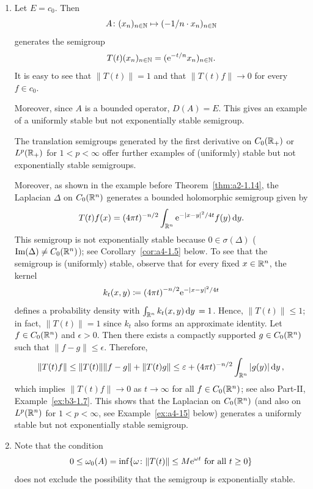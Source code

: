 \begin{example}\label{ex:a4-1.2}
\begin{enumerate}[\upshape (i), wide, labelindent=.25em]

\item 
Let $E = c_{0}$. 
Then 
\[
A \colon (x_{n})_{n \in \mathbb{N}} \mapsto (-1/n \cdot x_{n})_{n \in \mathbb{N}}
\] 
generates the semigroup 
\[
T(t)(x_{n})_{n \in \mathbb{N}} = (\mathrm{e}^{-t/n} x_{n})_{n \in \mathbb{N}}.
\]
It is easy to see that $\|T(t)\|=1$ and that $\|T(t)f\|\to 0$ for every $f \in c_{0}$.

Moreover, since $A$ is a bounded operator, $D(A) = E$.
This gives an example of a uniformly stable but not exponentially stable semigroup.

The translation semigroups generated by the first derivative on $C_0(\mathbb{R}_{+})$ or $L^{p}(\mathbb{R}_{+})$ for $1 < p < \infty$ offer further examples of (uniformly) stable but not exponentially stable semigroups.

Moreover, as shown in the example before Theorem~\ref{thm:a2-1.14},
the Laplacian $\Delta$ on $C_0(\mathbb{R}^{n})$ generates a bounded holomorphic semigroup given by 
\[
T(t)f(x) = (4\pi t)^{-n/2} \int_{\mathbb{R}^{n}} \mathrm{e}^{-|x-y|^{2}/4t} f(y)  \mathop{}\!\mathrm{d}{y} .
\]
This semigroup is not exponentially stable because $0 \in \sigma(\Delta)$ ($\mathop{}\!\mathrm{Im}(\Delta) \not= C_0(\mathbb{R}^{n})$); see Corollary~\ref{cor:a4-1.5} below. To see that the semigroup is (uniformly) stable, observe that for every fixed $x\in\mathbb{R}^n$, the kernel 
%
\[
	k_t(x,y) \coloneq  \mleft(4\pi t\mright)^{-n/2} \eu^{-|x-y|^{2}/4t}
\]
%
defines a probability density with $\int_{\mathbb{R}^n} k_t(x,y) \mathop{}\!\mathrm{d}{y}\, = 1$. Hence, $\|T(t)\|  \leq 1$; in fact, $\|T(t)\| = 1$ since $k_t$ also forms an approximate identity. Let $f \in C_0(\mathbb{R}^{n})$ and $\epsilon > 0$. Then there exists a compactly supported $g \in C_0(\mathbb{R}^{n})$ such that $\|f-g\|  \leq \epsilon$. Therefore,
\[
\|T(t)f\|  \leq  \|T(t)\|\|f-g\| + \|T(t)g\|  \leq \epsilon + (4\pi t)^{-n/2} \int_{\R^{n}} |g(y)|  \dy\, ,
\]
which implies  $\|T(t)f\| \to 0$ as $t\to\infty$ for all $f \in C_0(\mathbb{R}^{n})$; see also Part-II, Example~\ref{ex:b3-1.7}.
This shows that the Laplacian on $C_0(\mathbb{R}^{n})$ (and also on $L^{p}(\mathbb{R}^{n})$ for $1 < p < \infty$, see 
Example~\ref{ex:a4-15} below) generates a uniformly stable but not exponentially stable semigroup.

\item 
Note that the condition 
\[
0 \leq \omega_{0}(A) = \inf\{\omega\colon\|T(t)\| \leq M\eu^{\omega t} \text{ for all } t \geq 0\}
\]
does not exclude the possibility that the semigroup is exponentially stable.


\end{enumerate}
\end{example}
